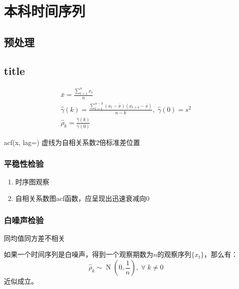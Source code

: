 \section{本科时间序列}

\subsection{预处理}
\subsection{title}
\begin{gather*}
	\bar{x}=\frac{\sum\limits_{t=1}^{n}x_t}{n} \\
	\hat{\gamma}(k)=\frac{\sum_{t=1}^{n-k}(x_t-\bar{x})(x_{t+k}-\bar{x})}{n-k},\;
	\hat{\gamma}(0)=s^2 \\
	\hat{\rho}_k=\frac{\hat{\gamma}(k)}{\hat{\gamma}(0)}
\end{gather*}

acf(x, lag=)
虚线为自相关系数$2$倍标准差位置

\subsubsection{平稳性检验}
\begin{enumerate}
	\item 时序图观察
	\item 自相关系数图acf函数，应呈现出迅速衰减向$0$
\end{enumerate}

\subsubsection{白噪声检验}
同均值同方差不相关
\begin{theorem}\label{theo:Barlett}
	如果一个时间序列是白噪声，得到一个观察期数为$n$的观察序列$\{x_t\}$，那么有：
	\begin{equation*}
		\hat{\rho}_k\sim\operatorname{N}\left(0,\frac{1}{n}\right),\;\forall\;k\ne0
	\end{equation*}
	近似成立。
\end{theorem}

